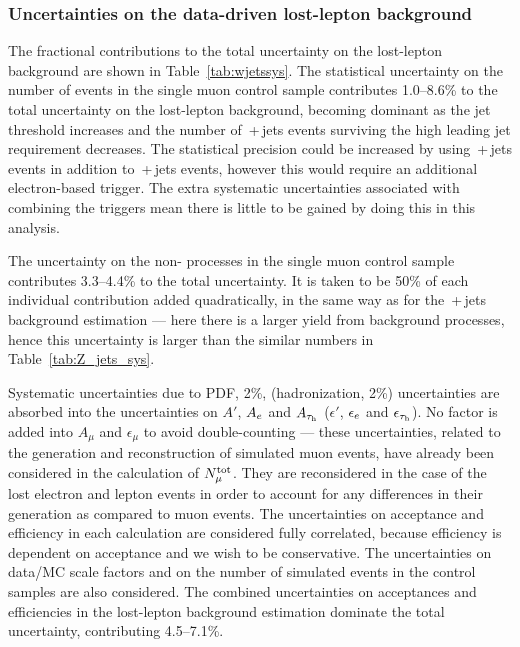 \subsubsection{Uncertainties on the data-driven lost-lepton background}

The fractional contributions to the total uncertainty on the lost-lepton background are shown in Table~\ref{tab:wjetssys}.
The statistical uncertainty on the number of events in the single muon control sample contributes 1.0--8.6\% to the total uncertainty on the lost-lepton background, becoming dominant as the jet threshold increases and the number of \wmunubr{}\,+\,jets events surviving the high leading jet \pt{} requirement decreases.  
The statistical precision could be increased by using \wenubr\,+\,jets events in addition to \wmunubr{}\,+\,jets events, 
however this would require an additional electron-based trigger. 
The extra systematic uncertainties associated with combining the triggers mean there is little to be gained by doing this in this analysis.

The uncertainty on the non-\wpj{} processes in the single muon control sample contributes 3.3--4.4\% to the total uncertainty. 
It is taken to be 50\% of each individual contribution added quadratically, in the same way as for the \znunubr{}\,+\,jets background estimation --- here there is a larger yield from background processes, hence this uncertainty is larger than the similar numbers in Table~\ref{tab:Z_jets_sys}.

Systematic uncertainties due to PDF, 2\%, (hadronization, 2\%) uncertainties are absorbed into the uncertainties on $A'$, $A_{e}$ and $A_{\tau_\mathrm{h}}$ ($\epsilon'$, $\epsilon_{e}$ and $\epsilon_{\tau_\mathrm{h}}$).
No factor is added into $A_{\mu}$ and $\epsilon_{\mu}$ to avoid double-counting --- these 
uncertainties, related to the generation and reconstruction of simulated muon events, have already been considered in the calculation of $N^{\rm tot}_{\mu}$. 
They are reconsidered in the case of the lost electron and \tauh lepton events in order to account for any differences in their generation as compared to muon events.
The uncertainties on acceptance and efficiency in each calculation are considered fully correlated, 
because efficiency is dependent on acceptance and we wish to be conservative.
The uncertainties on data/MC scale factors and on the number of simulated events in the control samples are also considered.
The combined uncertainties on acceptances and efficiencies in the lost-lepton background estimation dominate the total uncertainty, contributing 4.5--7.1\%.


